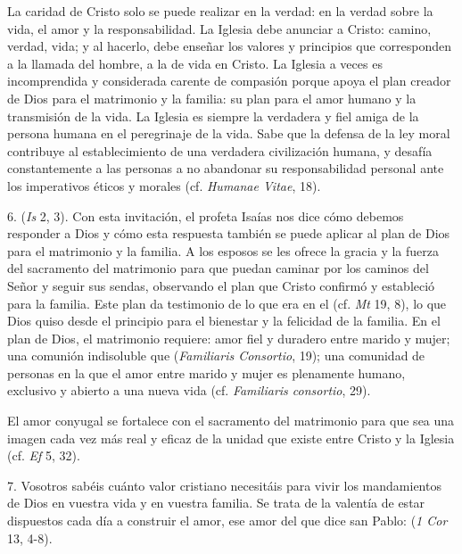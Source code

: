 \begin{body}
\begin{body}
		La caridad de Cristo solo se puede realizar en la verdad: en la verdad sobre la vida, el amor y la responsabilidad. La Iglesia debe anunciar a Cristo: camino, verdad, vida; y al hacerlo, debe enseñar los valores y principios que corresponden a la llamada del hombre, a la  de vida en Cristo. La Iglesia a veces es incomprendida y considerada carente de compasión porque apoya el plan creador de Dios para el matrimonio y la familia: su plan para el amor humano y la transmisión de la vida. La Iglesia es siempre la verdadera y fiel amiga de la persona humana en el peregrinaje de la vida. Sabe que la defensa de la ley moral contribuye al establecimiento de una verdadera civilización humana, y desafía constantemente a las personas a no abandonar su responsabilidad personal ante los imperativos éticos y morales (cf. \emph{Humanae Vitae}, 18).

		6.  (\emph{Is} 2, 3). Con esta invitación, el profeta Isaías nos dice cómo debemos responder a Dios y cómo esta respuesta también se puede aplicar al plan de Dios para el matrimonio y la familia. A los esposos se les ofrece la gracia y la fuerza del sacramento del matrimonio para que puedan caminar por los caminos del Señor y seguir sus sendas, observando el plan que Cristo confirmó y estableció para la familia. Este plan da testimonio de lo que era en el  (cf. \emph{Mt} 19, 8), lo que Dios quiso desde el principio para el bienestar y la felicidad de la familia. En el plan de Dios, el matrimonio requiere: amor fiel y duradero entre marido y mujer; una comunión indisoluble que  (\emph{Familiaris Consortio}, 19); una comunidad de personas en la que el amor entre marido y mujer es plenamente humano, exclusivo y abierto a una nueva vida (cf. \emph{Familiaris consortio}, 29).

		El amor conyugal se fortalece con el sacramento del matrimonio para que sea una imagen cada vez más real y eficaz de la unidad que existe entre Cristo y la Iglesia (cf. \emph{Ef} 5, 32).

		7. Vosotros sabéis cuánto valor cristiano necesitáis para vivir los mandamientos de Dios en vuestra vida y en vuestra familia. Se trata de la valentía de estar dispuestos cada día a construir el amor, ese amor del que dice san Pablo:  (\emph{1 Cor} 13, 4-8).


\end{body}
\end{body}
